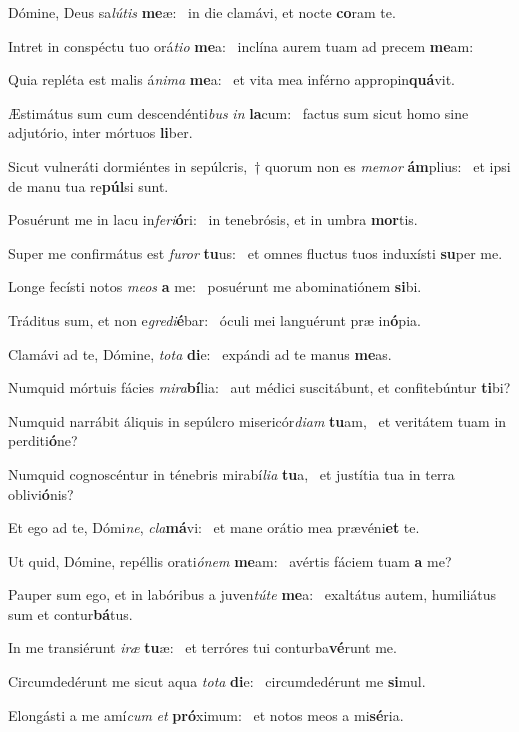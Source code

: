 \item Dómine, Deus sa\textit{lútis} \textbf{me}æ:~\psstar{} in die clamávi, et nocte \textbf{co}ram te.
\item Intret in conspéctu tuo orá\textit{tio} \textbf{me}a:~\psstar{} inclína aurem tuam ad precem \textbf{me}am:
\item Quia repléta est malis á\textit{nima} \textbf{me}a:~\psstar{} et vita mea inférno appropin\textbf{quá}vit.
\item Æstimátus sum cum descendénti\textit{bus} \textit{in} \textbf{la}cum:~\psstar{} factus sum sicut homo sine adjutório, inter mórtuos \textbf{li}ber.
\item Sicut vulneráti dormiéntes in sepúlcris,~† quorum non es \textit{memor} \textbf{ám}plius:~\psstar{} et ipsi de manu tua re\textbf{púl}si sunt.
\item Posuérunt me in lacu in\textit{feri}\textbf{ó}ri:~\psstar{} in tenebrósis, et in umbra \textbf{mor}tis.
\item Super me confirmátus est \textit{furor} \textbf{tu}us:~\psstar{} et omnes fluctus tuos induxísti \textbf{su}per me.
\item Longe fecísti notos \textit{meos} \textbf{a} me:~\psstar{} posuérunt me abominatiónem \textbf{si}bi.
\item Tráditus sum, et non e\textit{gredi}\textbf{é}bar:~\psstar{} óculi mei languérunt præ in\textbf{ó}pia.
\item Clamávi ad te, Dómine, \textit{tota} \textbf{di}e:~\psstar{} expándi ad te manus \textbf{me}as.
\item Numquid mórtuis fácies \textit{mira}\textbf{bí}lia:~\psstar{} aut médici suscitábunt, et confitebúntur \textbf{ti}bi?
\item Numquid narrábit áliquis in sepúlcro misericór\textit{diam} \textbf{tu}am,~\psstar{} et veritátem tuam in perditi\textbf{ó}ne?
\item Numquid cognoscéntur in ténebris mirabí\textit{lia} \textbf{tu}a,~\psstar{} et justítia tua in terra oblivi\textbf{ó}nis?
\item Et ego ad te, Dómi\textit{ne}, \textit{cla}\textbf{má}vi:~\psstar{} et mane orátio mea prævéni\textbf{et} te.
\item Ut quid, Dómine, repéllis orati\textit{ónem} \textbf{me}am:~\psstar{} avértis fáciem tuam \textbf{a} me?
\item Pauper sum ego, et in labóribus a juven\textit{túte} \textbf{me}a:~\psstar{} exaltátus autem, humiliátus sum et contur\textbf{bá}tus.
\item In me transiérunt \textit{iræ} \textbf{tu}æ:~\psstar{} et terróres tui conturba\textbf{vé}runt me.
\item Circumdedérunt me sicut aqua \textit{tota} \textbf{di}e:~\psstar{} circumdedérunt me \textbf{si}mul.
\item Elongásti a me amí\textit{cum} \textit{et} \textbf{pró}ximum:~\psstar{} et notos meos a mi\textbf{sé}ria.
